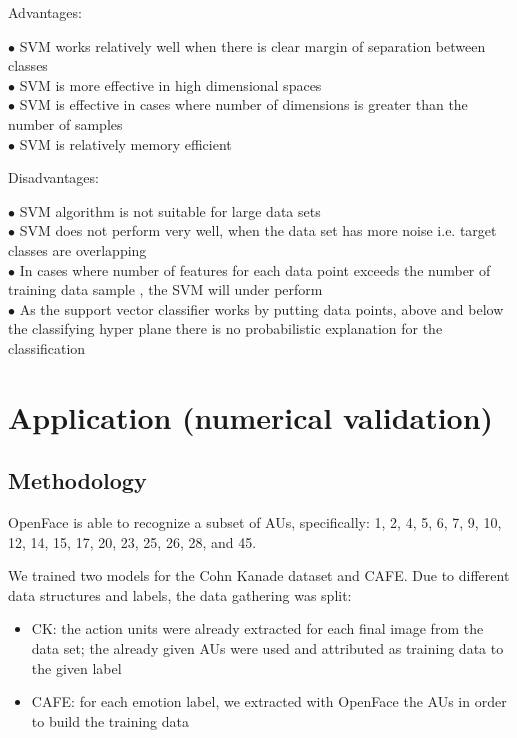 \documentclass[runningheads,a4paper,11pt]{report}
\begin{document}
Advantages:
\begin{itemize}
	 {\color{blue}$\bullet$} SVM works relatively well when there is clear margin of separation between classes\\
	{\color{blue}$\bullet$} SVM is more effective in high dimensional spaces\\
	{\color{blue}$\bullet$} SVM is effective in cases where number of dimensions is greater than the number of samples\\
	 {\color{blue}$\bullet$} SVM is relatively memory efficient\\
\end{itemize}
Disadvantages:
\begin{itemize}
 {\color{red}$\bullet$} SVM algorithm is not suitable for large data sets \\
 {\color{red}$\bullet$} SVM does not perform very well, when the data set has more noise i.e. target classes are overlapping \\
 {\color{red}$\bullet$} In cases where number of features for each data point exceeds the number of training data sample , the SVM will under perform \\
 {\color{red}$\bullet$} As the support vector classifier works by putting data points, above and below the classifying hyper plane there is no probabilistic explanation for the classification \\
\end{itemize}


\chapter{Application (numerical validation)}
\label{chapter:application}


\section{Methodology}
\label{section:methodology}

OpenFace is able to recognize a subset of AUs, specifically: 1, 2, 4, 5, 6, 7, 9, 10, 12, 14, 15, 17, 20, 23, 25, 26, 28, and 45. \cite{Baltrusaitis18}

We trained two models for the Cohn Kanade dataset and CAFE. Due to different data structures and labels, the data gathering was split:
\begin{itemize}
    \item CK: the action units were already extracted for each final image from the data set; the already given AUs were used and attributed as training data to the given label
    \item CAFE: for each emotion label, we extracted with OpenFace the AUs in order to build the training data
\end{itemize}
\end{document}
